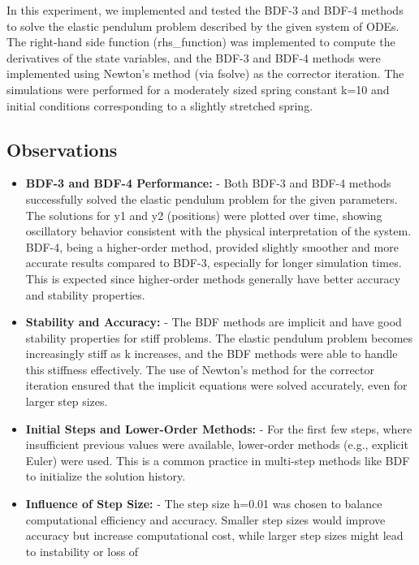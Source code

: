 \documentclass{article}
\begin{document}
In this experiment, we implemented and tested the BDF-3 and BDF-4 methods to solve the elastic pendulum problem
described by the given system of ODEs. The right-hand side function (rhs\_function) was implemented to compute the
derivatives of the state variables, and the BDF-3 and BDF-4 methods were implemented using Newton's method (via fsolve)
as the corrector iteration.
The simulations were performed for a moderately sized spring constant k=10 and initial conditions corresponding to a
slightly stretched spring.

\subsection{\textbf{Observations}}

\begin{itemize}
    \item \textbf{BDF-3 and BDF-4 Performance:}
    \subitem - Both BDF-3 and BDF-4 methods successfully solved the elastic pendulum problem for the given parameters.
    The solutions for y1 and y2 (positions) were plotted over time, showing oscillatory behavior consistent with the
    physical interpretation of the system.
    BDF-4, being a higher-order method, provided slightly smoother and more accurate results compared to BDF-3,
    especially for longer simulation times.
    This is expected since higher-order methods generally have better accuracy
    and stability properties.
    \item \textbf{Stability and Accuracy:}
    \subitem - The BDF methods are implicit and have good stability properties for stiff problems.
    The elastic pendulum problem becomes increasingly stiff as k increases, and the BDF methods were able to handle this
    stiffness effectively.
    The use of Newton's method for the corrector iteration ensured that the implicit equations were solved accurately,
    even for larger step sizes.
    \item \textbf{Initial Steps and Lower-Order Methods:}
    \subitem - For the first few steps, where insufficient previous values were available, lower-order methods (e.g.,
    explicit Euler) were used.
    This is a common practice in multi-step methods like BDF to initialize the solution history.
    \item \textbf{Influence of Step Size:}
    \subitem - The step size h=0.01 was chosen to balance computational efficiency and accuracy. Smaller step sizes
    would improve accuracy but increase computational cost, while larger step sizes might lead to instability or loss of

\end{itemize}
\end{document}
